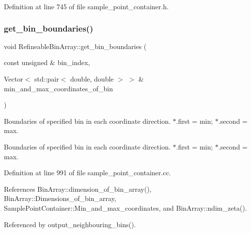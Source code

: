 Definition at line 745 of file sample\+\_\+point\+\_\+container.\+h.

\mbox{\label{classRefineableBinArray_aaf7e968daa598e460269fac55dfb55ca}} 
\subsubsection{\texorpdfstring{get\+\_\+bin\+\_\+boundaries()}{get\_bin\_boundaries()}}
{\footnotesize\ttfamily void Refineable\+Bin\+Array\+::get\+\_\+bin\+\_\+boundaries (\begin{DoxyParamCaption}\item[{const unsigned \&}]{bin\+\_\+index,  }\item[{Vector$<$ std\+::pair$<$ double, double $>$ $>$ \&}]{min\+\_\+and\+\_\+max\+\_\+coordinates\+\_\+of\+\_\+bin }\end{DoxyParamCaption})}



Boundaries of specified bin in each coordinate direction. $\ast$.first = min; $\ast$.second = max. 

Boundaries of specified bin in each coordinate direction. $\ast$.first = min; $\ast$.second = max. 

Definition at line 991 of file sample\+\_\+point\+\_\+container.\+cc.



References Bin\+Array\+::dimension\+\_\+of\+\_\+bin\+\_\+array(), Bin\+Array\+::\+Dimensions\+\_\+of\+\_\+bin\+\_\+array, Sample\+Point\+Container\+::\+Min\+\_\+and\+\_\+max\+\_\+coordinates, and Bin\+Array\+::ndim\+\_\+zeta().



Referenced by output\+\_\+neighbouring\+\_\+bins().

\mbox{\label{classRefineableBinArray_a517b1704286e6ee44b771af5348a6854}} 
